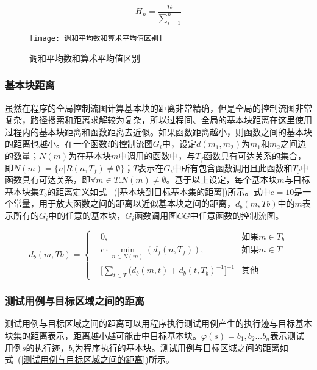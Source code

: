 \begin{equation}\label{调和平均数}
H_{n} = \frac{n}{\sum_{i=1}^{n}}
\end{equation}

\begin{figure}[htb]
\begin{center}
\texttt{[image: 调和平均数和算术平均值区别]}
\end{center}
\caption{调和平均数和算术平均值区别}
\label{调和平均数和算术平均值区别}
\end{figure}

\subsubsection{基本块距离}

虽然在程序的全局控制流图计算基本块的距离非常精确，但是全局的控制流图非常复杂，路径搜索和距离求解较为复杂，所以过程间、全局的基本块距离在这里使用过程内的基本块距离和函数距离去近似。如果函数距离越小，则函数之间的基本块的距离也越小。在一个函数$i$的控制流图$G_i$中，设定$d(m_1,m_2)$为$m_1$和$m_2$之间边的数量；$N(m)$为在基本块$m$中调用的函数中，与$T_f$函数具有可达关系的集合，即$N(m) = \{n | R(n, T_f) \neq \emptyset \}$；$T$表示在$G_i$中所有包含函数调用且此函数和$T_f$中函数具有可达关系，即$\forall m \in T.N(m) \neq \emptyset$。基于以上设定，每个基本块$m$与目标基本块集$T_b$的距离定义如式 ~(\ref{基本块到目标基本集的距离})所示。式中$c=10$是一个常量，用于放大函数之间的距离以近似基本块之间的距离，$d_{b}(m,Tb)$中的$m$表示所有的$G_i$中的任意的基本块，$G_i$函数调用图$CG$中任意函数的控制流图。

\begin{equation}\label{基本块到目标基本集的距离}
d_{b}(m,Tb)=\left\{
\begin{aligned}
& 0, & \text{如果} m \in T_{b} \\
& c \cdot \min\limits_{n \in N(m)}(d_{f}(n,T_{f})), & \text{如果} m \in T \\
& \lbrack \sum_{t \in T}(d_{b}(m,t) + d_{b}(t,T_{b}) ^{-1}\rbrack^{-1} & \text{其他}
\end{aligned}
\right.
\end{equation} 

\subsubsection{测试用例与目标区域之间的距离}

测试用例与目标区域之间的距离可以用程序执行测试用例产生的执行迹与目标基本块集的距离表示，距离越小越可能击中目标基本块。$\varphi(s)={b_1,b_2...b_n}$表示测试用例$s$的执行迹，$b_i$为程序执行的基本块。测试用例与目标区域之间的距离如式~(\ref{测试用例与目标区域之间的距离})所示。

